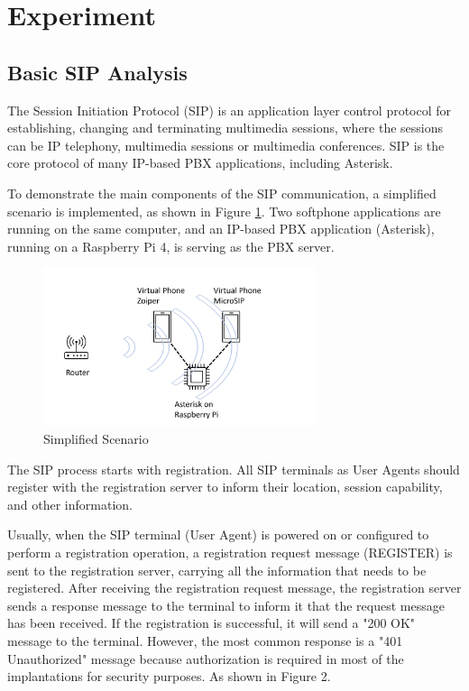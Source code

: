 \section{Experiment}	\label{sec:experiments}


\subsection{Basic SIP Analysis}

The Session Initiation Protocol (SIP) is an application layer control protocol for establishing, changing and terminating multimedia sessions, where the sessions can be IP telephony, multimedia sessions or multimedia conferences. SIP is the core protocol of many IP-based PBX applications, including Asterisk.

To demonstrate the main components of the SIP communication, a simplified scenario is implemented, as shown in Figure \ref{fig:topo}. Two softphone applications are running on the same computer, and an IP-based PBX application (Asterisk), running on a Raspberry Pi 4, is serving as the PBX server.

\begin{figure}[htbp]
\centerline{\includegraphics[width=8cm]{Images/experiment/exp1.png}}
\caption{Simplified Scenario}
\label{fig:topo}
\end{figure}

The SIP process starts with registration. All SIP terminals as User Agents should register with the registration server to inform their location, session capability, and other information.

Usually, when the SIP terminal (User Agent) is powered on or configured to perform a registration operation, a registration request message (REGISTER) is sent to the registration server, carrying all the information that needs to be registered. After receiving the registration request message, the registration server sends a response message to the terminal to inform it that the request message has been received. If the registration is successful, it will send a "200 OK" message to the terminal. However, the most common response is a "401 Unauthorized" message because authorization is required in most of the implantations for security purposes. As shown in Figure 2.


